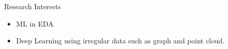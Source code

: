 
\begin{rSection}{Research Interests}
\begin{itemize}
    \item ML in EDA
    \item Deep Learning using irregular data such as graph and point cloud.
\end{itemize}
\end{rSection}




